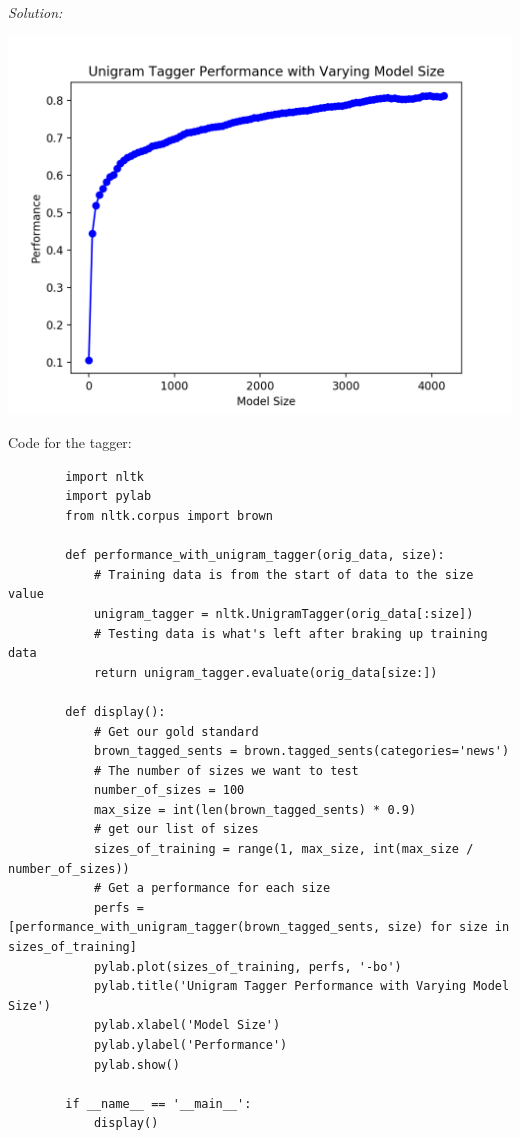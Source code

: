 \documentclass[11pt]{article}
\newenvironment{solution}{
	\vspace{10px}\noindent\emph{Solution:}
}{
	\vspace{10px}
}
\begin{document}
\begin{solution}
	
	\hspace*{-50pt}
	\includegraphics[width=550pt]{unigram_tagger_performance.png}
	
	Code for the tagger:
	
	\begin{lstlisting}
		import nltk
		import pylab
		from nltk.corpus import brown
		
		def performance_with_unigram_tagger(orig_data, size): 
			# Training data is from the start of data to the size value
			unigram_tagger = nltk.UnigramTagger(orig_data[:size])
			# Testing data is what's left after braking up training data
			return unigram_tagger.evaluate(orig_data[size:])
		
		def display():
			# Get our gold standard
			brown_tagged_sents = brown.tagged_sents(categories='news')
			# The number of sizes we want to test
			number_of_sizes = 100
			max_size = int(len(brown_tagged_sents) * 0.9)
			# get our list of sizes
			sizes_of_training = range(1, max_size, int(max_size / number_of_sizes)) 
			# Get a performance for each size
			perfs = [performance_with_unigram_tagger(brown_tagged_sents, size) for size in sizes_of_training]
			pylab.plot(sizes_of_training, perfs, '-bo')
			pylab.title('Unigram Tagger Performance with Varying Model Size')
			pylab.xlabel('Model Size')
			pylab.ylabel('Performance')
			pylab.show()
		
		if __name__ == '__main__': 
			display()
	\end{lstlisting}
	
\end{solution} 
\end{document}
